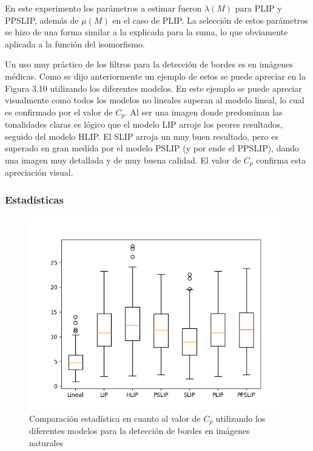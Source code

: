 En este experimento los par\'ametros a estimar fueron $\lambda(M)$ para PLIP y PPSLIP, adem\'as de $\mu(M)$ en el caso de PLIP. La selecci\'on de estos par\'ametros se hizo de una forma similar a la explicada para la suma, lo que obviamente aplicada a la funci\'on del isomorfismo.

Un uso muy pr\'actico de los filtros para la detecci\'on de bordes es en im\'agenes m\'edicas. Como se dijo anteriormente un ejemplo de estos se puede apreciar en la Figura 3.10 utilizando los diferentes modelos. En este ejemplo se puede apreciar visualmente como todos los modelos no lineales superan al modelo lineal, lo cual es confirmado por el valor de $C_p$. Al ser una imagen donde predominan las tonalidades claras es l\'ogico que el modelo LIP arroje los peores resultados, seguido del modelo HLIP. El SLIP arroja un muy buen resultado, pero es superado en gran medida por el modelo PSLIP (y por ende el PPSLIP), dando una imagen muy detallada y de muy buena calidad. El valor de $C_p$ confirma esta apreciaci\'on visual.

\subsubsection{Estad\'isticas}

\begin{figure}
	\begin{center}
		\includegraphics[width=10.0 cm]{images/graphics/natural/ed/ed_all.png}
		\caption{Comparaci\'on estad\'istica en cuanto al valor de $C_p$ utilizando los diferentes modelos para la detecci\'on de bordes en im\'agenes naturales}
	\end{center}
\end{figure}


